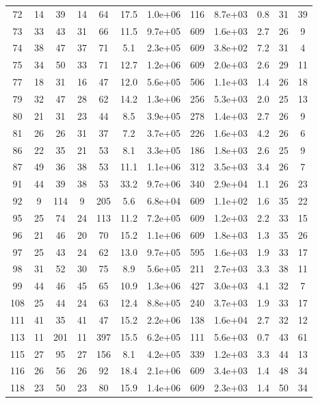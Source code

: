 \begin{table}
\begin{tabular}{cccccccccccc}
72 & 14 & 39 & 14 & 64 & 17.5 & 1.0e+06 & 116 & 8.7e+03 & 0.8 & 31 & 39 \\
73 & 33 & 43 & 31 & 66 & 11.5 & 9.7e+05 & 609 & 1.6e+03 & 2.7 & 26 & 9 \\
74 & 38 & 47 & 37 & 71 & 5.1 & 2.3e+05 & 609 & 3.8e+02 & 7.2 & 31 & 4 \\
75 & 34 & 50 & 33 & 71 & 12.7 & 1.2e+06 & 609 & 2.0e+03 & 2.6 & 29 & 11 \\
77 & 18 & 31 & 16 & 47 & 12.0 & 5.6e+05 & 506 & 1.1e+03 & 1.4 & 26 & 18 \\
79 & 32 & 47 & 28 & 62 & 14.2 & 1.3e+06 & 256 & 5.3e+03 & 2.0 & 25 & 13 \\
80 & 21 & 31 & 23 & 44 & 8.5 & 3.9e+05 & 278 & 1.4e+03 & 2.7 & 26 & 9 \\
81 & 26 & 26 & 31 & 37 & 7.2 & 3.7e+05 & 226 & 1.6e+03 & 4.2 & 26 & 6 \\
86 & 22 & 35 & 21 & 53 & 8.1 & 3.3e+05 & 186 & 1.8e+03 & 2.6 & 25 & 9 \\
87 & 49 & 36 & 38 & 53 & 11.1 & 1.1e+06 & 312 & 3.5e+03 & 3.4 & 26 & 7 \\
91 & 44 & 39 & 38 & 53 & 33.2 & 9.7e+06 & 340 & 2.9e+04 & 1.1 & 26 & 23 \\
92 & 9 & 114 & 9 & 205 & 5.6 & 6.8e+04 & 609 & 1.1e+02 & 1.6 & 35 & 22 \\
95 & 25 & 74 & 24 & 113 & 11.2 & 7.2e+05 & 609 & 1.2e+03 & 2.2 & 33 & 15 \\
96 & 21 & 46 & 20 & 70 & 15.2 & 1.1e+06 & 609 & 1.8e+03 & 1.3 & 35 & 26 \\
97 & 25 & 43 & 24 & 62 & 13.0 & 9.7e+05 & 595 & 1.6e+03 & 1.9 & 33 & 17 \\
98 & 31 & 52 & 30 & 75 & 8.9 & 5.6e+05 & 211 & 2.7e+03 & 3.3 & 38 & 11 \\
99 & 44 & 46 & 45 & 65 & 10.9 & 1.3e+06 & 427 & 3.0e+03 & 4.1 & 32 & 7 \\
108 & 25 & 44 & 24 & 63 & 12.4 & 8.8e+05 & 240 & 3.7e+03 & 1.9 & 33 & 17 \\
111 & 41 & 35 & 41 & 47 & 15.2 & 2.2e+06 & 138 & 1.6e+04 & 2.7 & 32 & 12 \\
113 & 11 & 201 & 11 & 397 & 15.5 & 6.2e+05 & 111 & 5.6e+03 & 0.7 & 43 & 61 \\
115 & 27 & 95 & 27 & 156 & 8.1 & 4.2e+05 & 339 & 1.2e+03 & 3.3 & 44 & 13 \\
116 & 26 & 56 & 26 & 92 & 18.4 & 2.1e+06 & 609 & 3.4e+03 & 1.4 & 48 & 34 \\
118 & 23 & 50 & 23 & 80 & 15.9 & 1.4e+06 & 609 & 2.3e+03 & 1.4 & 50 & 34 \\

\end{tabular}
\end{table}
